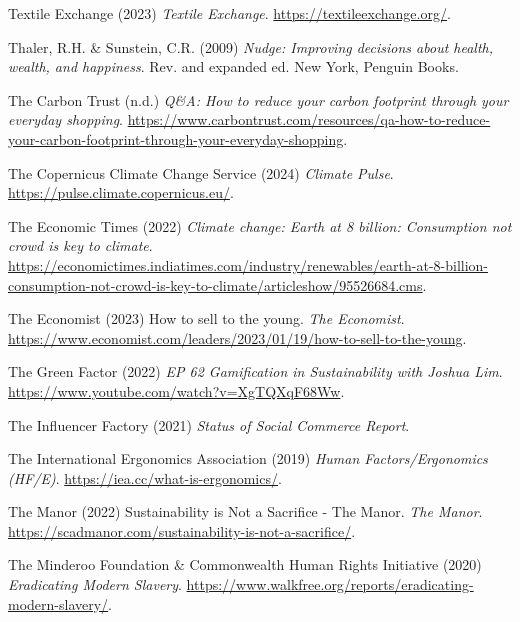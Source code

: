 \documentclass[
  letterpaper,
  DIV=11,
  numbers=noendperiod]{scrartcl}
\newlength{\cslhangindent}
\newenvironment{CSLReferences}[2] %
 {\begin{list}{}{%
  \setlength{\itemindent}{0pt}
  \setlength{\leftmargin}{0pt}
  \setlength{\parsep}{0pt}
  \ifodd #1
   \setlength{\leftmargin}{\cslhangindent}
   \setlength{\itemindent}{-1\cslhangindent}
  \fi
  \setlength{\itemsep}{#2\baselineskip}}}
 {\end{list}}
\begin{document}
\begin{CSLReferences}{0}{1}
Textile Exchange (2023) \emph{Textile {Exchange}}.
\url{https://textileexchange.org/}.

Thaler, R.H. \& Sunstein, C.R. (2009) \emph{Nudge: Improving decisions
about health, wealth, and happiness}. Rev. and expanded ed. New York,
Penguin Books.

The Carbon Trust (n.d.) \emph{Q\&{A}: {How} to reduce your carbon
footprint through your everyday shopping}.
\url{https://www.carbontrust.com/resources/qa-how-to-reduce-your-carbon-footprint-through-your-everyday-shopping}.

The Copernicus Climate Change Service (2024) \emph{Climate {Pulse}}.
\url{https://pulse.climate.copernicus.eu/}.

The Economic Times (2022) \emph{Climate change: {Earth} at 8 billion:
{Consumption} not crowd is key to climate}.
\url{https://economictimes.indiatimes.com/industry/renewables/earth-at-8-billion-consumption-not-crowd-is-key-to-climate/articleshow/95526684.cms}.

The Economist (2023) How to sell to the young. \emph{The Economist}.
\url{https://www.economist.com/leaders/2023/01/19/how-to-sell-to-the-young}.

The Green Factor (2022) \emph{{EP} 62 {Gamification} in {Sustainability}
with {Joshua Lim}}. \url{https://www.youtube.com/watch?v=XgTQXqF68Ww}.

The Influencer Factory (2021) \emph{Status of {Social Commerce Report}}.

The International Ergonomics Association (2019) \emph{Human
{Factors}/{Ergonomics} ({HF}/{E})}.
\url{https://iea.cc/what-is-ergonomics/}.

The Manor (2022) Sustainability is {Not} a {Sacrifice} - {The Manor}.
\emph{The Manor}.
\url{https://scadmanor.com/sustainability-is-not-a-sacrifice/}.

The Minderoo Foundation \& Commonwealth Human Rights Initiative (2020)
\emph{Eradicating {Modern Slavery}}.
\url{https://www.walkfree.org/reports/eradicating-modern-slavery/}.


\end{CSLReferences}
\end{document}
